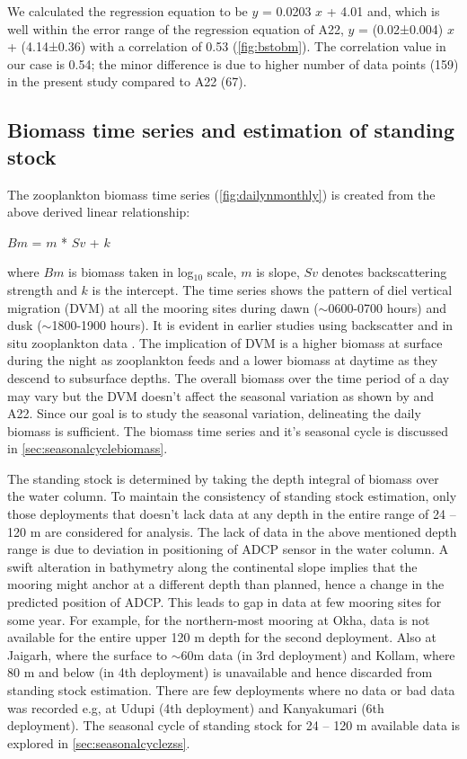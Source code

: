 \documentclass{article}
\begin{document}
	We calculated the regression equation to be $y$ = 0.0203 $x$  + 4.01 and, which is well within the error range of the regression equation of A22, $y$ = (0.02±0.004) $x$ + (4.14±0.36) with a correlation of 0.53 (\cref{fig:bstobm}). The correlation value in our case is 0.54; the minor difference is  due to higher number of data points (159) in the present study compared to A22 (67). 
	
	\subsection{Biomass time series and estimation of standing stock}
	
	The zooplankton biomass time series (\cref{fig:dailynmonthly}) is created from the above derived linear relationship: 
	
	$Bm$ = $m$ * $Sv$ + $k$ 
	
	where $Bm$ is biomass taken in log$_{10}$ scale, $m$ is slope, $Sv$ denotes  backscattering strength and $k$ is the intercept. The time series shows the pattern of diel vertical migration (DVM) at all the mooring sites during dawn ($\sim$0600-0700 hours) and dusk ($\sim$1800-1900 hours). It is evident in earlier studies using backscatter \citep{ashjian2002distribution, smith2005mesozooplankton, inoue2016diel,ursella2018evidence} and in situ zooplankton data \citep{padmavati1998vertical}. The implication of DVM is a higher biomass at surface during the night as zooplankton feeds and a lower biomass at daytime as they descend to subsurface depths. The overall biomass over the time period of a day may vary but the DVM doesn't affect the seasonal variation as shown by \citet{jiang2007temporal} and A22. Since our goal is to study the seasonal variation, delineating the daily biomass is sufficient. The biomass time series and it's seasonal cycle is discussed in \autoref{sec:seasonalcyclebiomass}.
	
	The standing stock is determined by taking the depth integral of biomass over the water column. To maintain the consistency of standing stock estimation, only those deployments that doesn't lack data at any depth in the entire range of 24 -- 120 m are considered for analysis. The lack of data in the above mentioned depth range is due to deviation in positioning of ADCP sensor in the water column. A swift alteration in bathymetry along the continental slope implies that the mooring might anchor at a different depth than planned, hence a change in the predicted position of ADCP. This leads to gap in data at few mooring sites for some year. For example, for the northern-most mooring at Okha, data is not available for the entire upper 120 m depth for the second deployment. Also at Jaigarh, where the surface to $\sim$60m data (in 3rd deployment) and Kollam, where 80 m and below (in 4th deployment) is unavailable and hence discarded from standing stock estimation. There are few deployments where no data or bad data was recorded e.g, at Udupi (4th deployment) and Kanyakumari (6th deployment). The seasonal cycle of standing stock for 24 -- 120 m available data is explored in \autoref{sec:seasonalcyclezss}.
	
\end{document}
